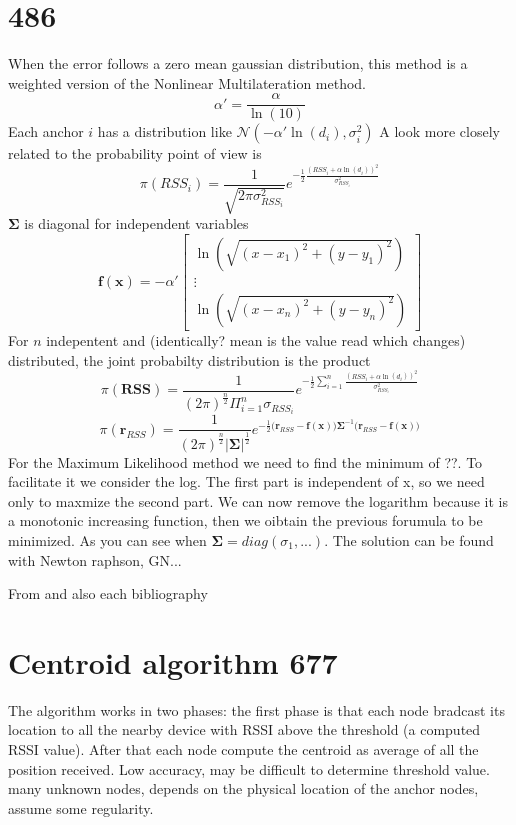 \documentclass[12pt]{report}
\begin{document}
\section{486}
When the error follows a zero mean gaussian distribution, this method is a weighted version of the Nonlinear Multilateration method. 
\begin{equation}
    \alpha'=\frac{\alpha}{\ln(10)}
\end{equation}
Each anchor $i$ has a distribution like $\mathcal{N}(-\alpha'\ln(d_i),\sigma^2_i)$
A look more closely related to the probability point of view is
\begin{equation}
    \pi(RSS_i)=\frac{1}{\sqrt{2\pi\sigma^2_{RSS_i}}}e^{-\frac{1}{2}\frac{(RSS_i+\alpha\ln(d_i))^2}{\sigma^2_{RSS_i}}}
\end{equation}
$\mathbf{\Sigma}$ is diagonal for independent variables
$$\mathbf{f}(\mathbf{x})=-\alpha'\begin{bmatrix}
\ln(\sqrt{(x-x_1)^2+(y-y_1)^2})\\
\vdots\\
\ln(\sqrt{(x-x_n)^2+(y-y_n)^2})
\end{bmatrix}$$
For $n$ indepentent and (identically? mean is the value read which changes) distributed, the joint probabilty distribution is the product
\begin{equation}
    \pi(\mathbf{RSS})=\frac{1}{(2\pi)^{\frac{n}{2}}\Pi_{i=1}^n\sigma_{RSS_i}}e^{-\frac{1}{2}\sum_{i=1}^n\frac{(RSS_i+\alpha\ln(d_i))^2}{\sigma^2_{RSS_i}}}
\end{equation}
\begin{equation}
    \pi(\mathbf{r}_{RSS})=\frac{1}{(2\pi)^{\frac{n}{2}}|\mathbf{\Sigma}|^{\frac{1}{2}}}e^{-\frac{1}{2}\big(\mathbf{r}_{RSS}-\mathbf{f}(\mathbf{x})\big)\mathbf{\Sigma}^{-1}\big(\mathbf{r}_{RSS}-\mathbf{f}(\mathbf{x})\big)}
\end{equation}
For the Maximum Likelihood method we need to find the minimum of ??. To facilitate it we consider the log. The first part is independent of x, so we need only to maxmize the second part. We can now remove the logarithm because it is a monotonic increasing function, then we oibtain the previous forumula to be minimized. As you can see when $\mathbf{\Sigma}=diag{(\sigma_1,...)}$. The solution can be found with Newton raphson, GN...
\clearpage


From \cite{KAUR201982} and also each bibliography
\section{Centroid algorithm 677}
The algorithm works in two phases: the first phase is that each node bradcast its location to all the nearby device with RSSI above the threshold (a computed RSSI value). After that each node compute the centroid as average of all the position received. Low accuracy, may be difficult to determine threshold value. many unknown nodes, depends on the physical location of the anchor nodes, assume some regularity.
\end{document}

